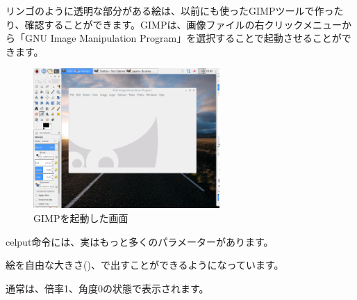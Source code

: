 リンゴのように透明な部分がある絵は、以前にも使ったGIMPツールで作ったり、確認することができます。GIMPは、画像ファイルの右クリックメニューから「GNU Image Manipulation Program」を選択することで起動させることができます。

\begin{figure}[H]
    \begin{center}
      \includegraphics[keepaspectratio,width=7.091cm,height=5.318cm]{text04-img/s_gimpboot.png}
      \caption{GIMPを起動した画面}
    \end{center}
    \label{fig:prog_menu}
\end{figure}

celput命令には、実はもっと多くのパラメーターがあります。



\begin{description}
    \item {}
\end{description}



\begin{description}
    \item {}
    \item {}
    \item {}
\end{description}

絵を自由な大きさ()、で出すことができるようになっています。

通常は、倍率1、角度0の状態で表示されます。


